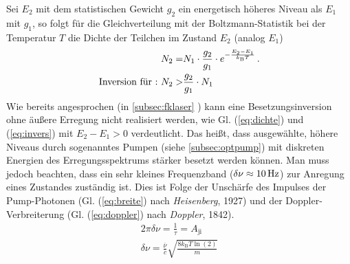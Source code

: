 \documentclass[numbers=noenddot,12pt,a4paper]{scrartcl}
\newcommand{\ix}[1]{_\text{#1}}
\newcommand{\tilt}[1]{\mbox{\textit{#1}}}
\newcommand{\euler}{\mathnormal{e}}
\begin{document}
Sei $E\ix{2}$ mit dem statistischen Gewicht $g\ix{2}$ ein energetisch höheres Niveau als $E\ix{1}$ mit $g\ix{1}$, so folgt für die Gleichverteilung mit der Boltzmann-Statistik bei der Temperatur $T$ die Dichte der Teilchen im Zustand $E\ix{2}$ (analog $E\ix{1}$)
\begin{align}
	N\ix{2}=&N\ix{1}\cdot\frac{g\ix{2}}{g\ix{1}}\cdot\euler^{-\frac{E\ix{2}-E\ix{1}}{k\ix{B}T}} \,. \label{eq:dichte} \\
	\text{Inversion für :} \,\, N\ix{2}>&\frac{g\ix{2}}{g\ix{1}}\cdot N\ix{1} \label{eq:invers}
	\end{align}
Wie bereits angesprochen (in \ref{subsec:fklaser} ) kann eine Besetzungsinversion ohne äußere Erregung nicht realisiert werden, wie Gl. (\ref{eq:dichte}) und (\ref{eq:invers}) mit $E\ix{2}-E\ix{1}>0$ verdeutlicht. Das heißt, dass ausgewählte, höhere Niveaus durch sogenanntes Pumpen (siehe \ref{subsec:optpump}) mit diskreten Energien des Erregungsspektrums stärker besetzt werden können. Man muss jedoch beachten, dass ein sehr kleines Frequenzband ($\delta\nu\approx\unit[10]{Hz}$) zur Anregung eines Zustandes zuständig ist. Dies ist Folge der Unschärfe des Impulses der Pump-Photonen (Gl. (\ref{eq:breite}) nach \tilt{Heisenberg}, 1927) und der Doppler-Verbreiterung (Gl. (\ref{eq:doppler}) nach \tilt{Doppler}, 1842).
\begin{align}
	2\pi\delta\nu=\frac{1}{\tau}=A\ix{ji} \label{eq:breite}\\
	\delta\nu=\frac{\overline{\nu}}{c}\sqrt{\frac{8k\ix{B}T\ln\left(2\right)}{m}} \label{eq:doppler}
\end{align}
\pagebreak
\end{document}
